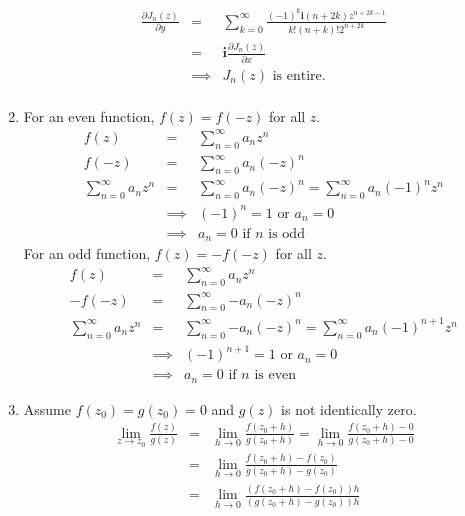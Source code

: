 \documentclass{article}%
\newcommand\I{\textbf{i}}
\begin{document}
\begin{enumerate}
\begin{eqnarray*}
        \frac{\partial J_n(z)}{\partial y} &=& \sum\limits_{k=0}^{\infty}{\frac{(-1)^k \I (n+2k) z^{n+2k-1}}{k!(n+k)!2^{n+2k}}} \\
                                           &=& \I \frac{\partial J_n(z)}{\partial x} \\
                                           &\implies& J_n(z) \text{ is entire.}\\
    \end{eqnarray*}
    \item %
    For an even function, $f(z) = f(-z)$ for all $z$.
    \begin{eqnarray*}
        f(z) &=& \sum\limits_{n=0}^{\infty}{a_n z^n} \\
        f(-z) &=& \sum\limits_{n=0}^{\infty}{a_n (-z)^n} \\
        \sum\limits_{n=0}^{\infty}{a_n z^n} &=&  \sum\limits_{n=0}^{\infty}{a_n (-z)^n} = \sum\limits_{n=0}^{\infty}{a_n (-1)^{n}z^n} \\
        &\implies& (-1)^{n} = 1 \text{ or } a_n=0 \\
        &\implies& a_n = 0 \text{ if } n \text{ is odd }
    \end{eqnarray*}
    For an odd function, $f(z) = -f(-z)$ for all $z$.
    \begin{eqnarray*}
        f(z) &=& \sum\limits_{n=0}^{\infty}{a_n z^n} \\
        -f(-z) &=& \sum\limits_{n=0}^{\infty}{-a_n (-z)^n} \\
        \sum\limits_{n=0}^{\infty}{a_n z^n} &=&  \sum\limits_{n=0}^{\infty}{-a_n (-z)^n} = \sum\limits_{n=0}^{\infty}{a_n (-1)^{n+1}z^n} \\
        &\implies& (-1)^{n+1} = 1 \text{ or } a_n=0 \\
        &\implies& a_n = 0 \text{ if } n \text{ is even }
    \end{eqnarray*}
    \item %
    Assume $f(z_0) = g(z_0) = 0$ and $g(z)$ is not identically zero.
    \begin{eqnarray*}
        \lim_{z \to z_0}{\frac{f(z)}{g(z)}} &=& \lim_{h \to 0}{\frac{f(z_0+h)}{g(z_0+h)}} = \lim_{h \to 0}{\frac{f(z_0+h)-0}{g(z_0+h)-0}} \\
                                            &=& \lim_{h \to 0}{\frac{f(z_0+h)-f(z_0)}{g(z_0+h)-g(z_0)}} \\
                                            &=& \lim_{h \to 0}{\frac{(f(z_0+h)-f(z_0))h}{(g(z_0+h)-g(z_0))h}} \\

\end{eqnarray*}
\end{enumerate}
\end{document}
